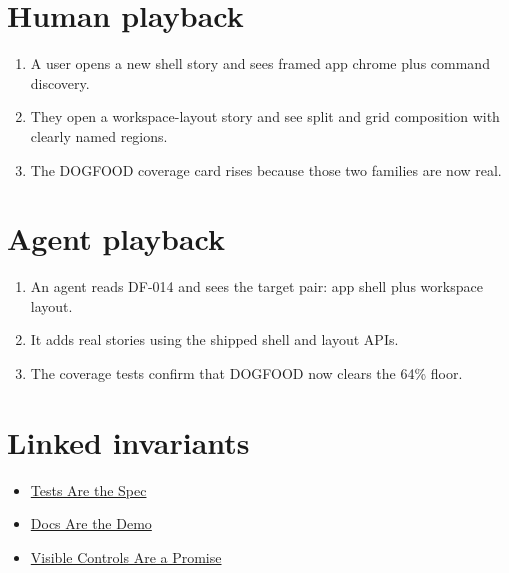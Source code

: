 \section{Human playback}\label{record-076-human-playback}

\begin{enumerate}
\def\labelenumi{\arabic{enumi}.}
\tightlist
\item
  A user opens a new shell story and sees framed app chrome plus command discovery.
\item
  They open a workspace-layout story and see split and grid composition with clearly named regions.
\item
  The DOGFOOD coverage card rises because those two families are now real.
\end{enumerate}

\section{Agent playback}\label{record-076-agent-playback}

\begin{enumerate}
\def\labelenumi{\arabic{enumi}.}
\tightlist
\item
  An agent reads DF-014 and sees the target pair: app shell plus workspace layout.
\item
  It adds real stories using the shipped shell and layout APIs.
\item
  The coverage tests confirm that DOGFOOD now clears the 64\% floor.
\end{enumerate}

\section{Linked invariants}\label{record-076-linked-invariants}

\begin{itemize}
\tightlist
\item
  \href{https://github.com/flyingrobots/bijou/blob/cbd70612140e7a450d764b3c7be1c6af878b99bc/docs/invariants/tests-are-the-spec.md}{Tests Are the Spec}
\item
  \href{https://github.com/flyingrobots/bijou/blob/cbd70612140e7a450d764b3c7be1c6af878b99bc/docs/invariants/docs-are-the-demo.md}{Docs Are the Demo}
\item
  \href{https://github.com/flyingrobots/bijou/blob/cbd70612140e7a450d764b3c7be1c6af878b99bc/docs/invariants/visible-controls-are-a-promise.md}{Visible Controls Are a Promise}
\end{itemize}

